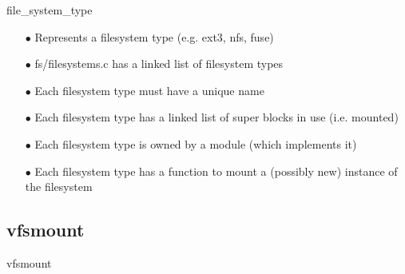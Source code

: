 \documentclass{beamer}
\begin{document}
\begin{frame}{file\_system\_type}
	
	\begin{itemize}[<+->]
	
		\item[$\bullet$]{Represents a filesystem type (e.g. ext3, nfs, fuse)}
		\item[$\bullet$]{fs/filesystems.c has a linked list of filesystem types}
		\item[$\bullet$]{Each filesystem type must have a unique name}
		\item[$\bullet$]{Each filesystem type has a linked list of super blocks in use (i.e. mounted)}		
		\item[$\bullet$]{Each filesystem type is owned by a module (which implements it)}
		\item[$\bullet$]{Each filesystem type has a function to mount a (possibly new) instance of the filesystem}
		
	\end{itemize}

\end{frame}

\subsection{vfsmount}
	
\begin{frame}{vfsmount}
	
	
\end{frame}
\end{document}
